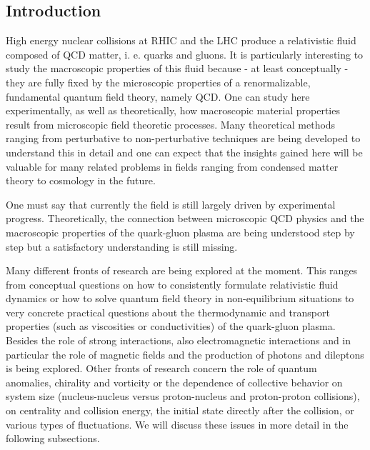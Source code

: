 \subsection{Introduction}

High energy nuclear collisions at RHIC and the LHC produce a relativistic fluid composed of QCD matter, i. e. quarks and gluons. It is particularly interesting to study the macroscopic properties of this fluid because - at least conceptually - they are fully fixed by the microscopic properties of a renormalizable, fundamental quantum field theory, namely QCD. One can study here experimentally, as well as theoretically, how macroscopic material properties result from microscopic field theoretic processes. Many theoretical methods ranging from perturbative to non-perturbative techniques are being developed to understand this in detail and one can expect that the insights gained here will be valuable for many related problems in fields ranging from condensed matter theory to cosmology in the future.  

One must say that currently the field is still largely driven by experimental progress. Theoretically, the connection between microscopic QCD physics and the macroscopic properties of the quark-gluon plasma are being understood step by step but a satisfactory understanding is still missing. 

Many different fronts of research are being explored at the moment. This ranges from conceptual questions on how to consistently formulate relativistic fluid dynamics or how to solve quantum field theory in non-equilibrium situations to very concrete practical questions about the thermodynamic and transport properties (such as viscosities or conductivities) of the quark-gluon plasma. Besides the role of strong interactions, also electromagnetic interactions and in particular the role of magnetic fields and the production of photons and dileptons is being explored. Other fronts of research concern the role of quantum anomalies, chirality and vorticity or the dependence of collective behavior on system size (nucleus-nucleus versus proton-nucleus and proton-proton collisions), on centrality and collision energy, the initial state directly after the collision, or various types of fluctuations. We will discuss these issues in more detail in the following subsections.


